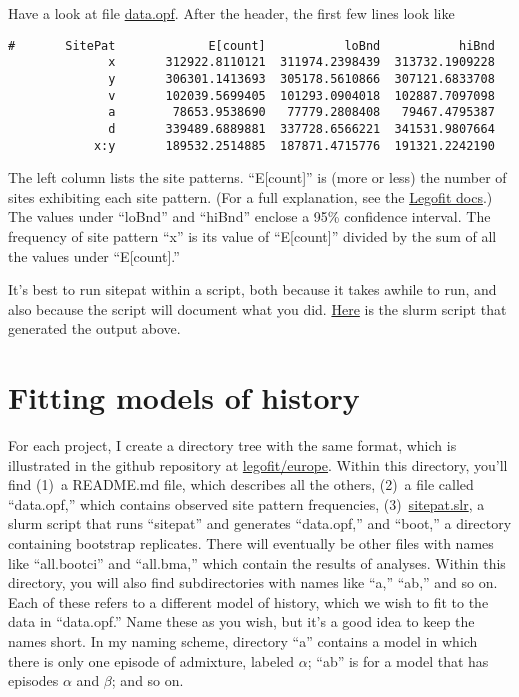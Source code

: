 \documentclass[11pt]{article}
\begin{document}
Have a look at file
\href{https://github.com/alanrogers/agar22/blob/main/legofit/europe/data.opf}{data.opf}. After
the header, the first few lines look like
\begin{verbatim}
#       SitePat             E[count]           loBnd           hiBnd
              x       312922.8110121  311974.2398439  313732.1909228
              y       306301.1413693  305178.5610866  307121.6833708
              v       102039.5699405  101293.0904018  102887.7097098
              a        78653.9538690   77779.2808408   79467.4795387
              d       339489.6889881  337728.6566221  341531.9807664
            x:y       189532.2514885  187871.4715776  191321.2242190
\end{verbatim}
The left column lists the site patterns. ``E[count]'' is (more or
less) the number of sites exhibiting each site pattern. (For a full
explanation, see the
\href{https://alanrogers.github.io/legofit/html/index.html#sitepattern}{Legofit
  docs}.) The values under ``loBnd'' and ``hiBnd'' enclose a 95\%
confidence interval. The frequency of site pattern ``x'' is its value
of ``E[count]'' divided by the sum of all the values under ``E[count].''

It's best to run sitepat within a script, both because it takes awhile
to run, and also because the script will document what you did.
\href{https://github.com/alanrogers/agar22/blob/main/legofit/europe/sitepat.slr}{Here}
is the slurm script that generated the output above.

\section{Fitting models of history}
\label{sec.fit}
For each project, I create a directory tree with the same format,
which is illustrated in the github repository at
\href{https://github.com/alanrogers/agar22/tree/main/legofit/europe}{legofit/europe}. Within
this directory, you'll find (1)~a README.md file, which describes all
the others, (2)~a file called ``data.opf,'' which contains observed
site pattern frequencies, (3)~\href{sitepat.slr.html}{sitepat.slr}, a
slurm script that runs ``sitepat'' and generates ``data.opf,'' and
``boot,'' a directory containing bootstrap replicates.  There will
eventually be other files with names like ``all.bootci'' and
``all.bma,'' which contain the results of analyses.  Within this
directory, you will also find subdirectories with names like ``a,''
``ab,'' and so on. Each of these refers to a different model of
history, which we wish to fit to the data in ``data.opf.''  Name these
as you wish, but it's a good idea to keep the names short. In my
naming scheme, directory ``a'' contains a model in which there is only
one episode of admixture, labeled $\alpha$; ``ab'' is for a model that
has episodes $\alpha$ and $\beta$; and so on.
\end{document}
